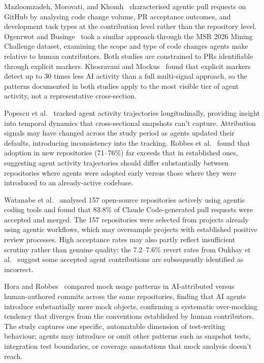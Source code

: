 Mazloomzadeh, Morovati, and Khomh~\cite{mazloomzadeh2026} characterised agentic pull requests on GitHub by analysing code change volume, PR acceptance outcomes, and development task types at the contribution level rather than the repository level. Ogenrwot and Businge~\cite{ogenrwot2026} took a similar approach through the MSR 2026 Mining Challenge dataset, examining the scope and type of code changes agents make relative to human contributors. Both studies are constrained to PRs identifiable through explicit markers. Khosravani and Mockus~\cite{khosravani2026} found that explicit markers detect up to 30 times less AI activity than a full multi-signal approach, so the patterns documented in both studies apply to the most visible tier of agent activity, not a representative cross-section.

Popescu et al.~\cite{popescu2026} tracked agent activity trajectories longitudinally, providing insight into temporal dynamics that cross-sectional snapshots can't capture. Attribution signals may have changed across the study period as agents updated their defaults, introducing inconsistency into the tracking. Robbes et al.~\cite{robbesAgenticVery2026} found that adoption in new repositories (71--76\%) far exceeds that in established ones, suggesting agent activity trajectories should differ substantially between repositories where agents were adopted early versus those where they were introduced to an already-active codebase.

Watanabe et al.~\cite{watanabe2025} analysed 157 open-source repositories actively using agentic coding tools and found that 83.8\% of Claude Code-generated pull requests were accepted and merged. The 157 repositories were selected from projects already using agentic workflows, which may oversample projects with established positive review processes. High acceptance rates may also partly reflect insufficient scrutiny rather than genuine quality: the 7.2--7.6\% revert rates from Oukhay et al.~\cite{oukhay2026} suggest some accepted agent contributions are subsequently identified as incorrect.

Hora and Robbes~\cite{horaRobbes2026} compared mock usage patterns in AI-attributed versus human-authored commits across the same repositories, finding that AI agents introduce substantially more mock objects, confirming a systematic over-mocking tendency that diverges from the conventions established by human contributors. The study captures one specific, automatable dimension of test-writing behaviour; agents may introduce or omit other patterns such as snapshot tests, integration test boundaries, or coverage annotations that mock analysis doesn't reach.

